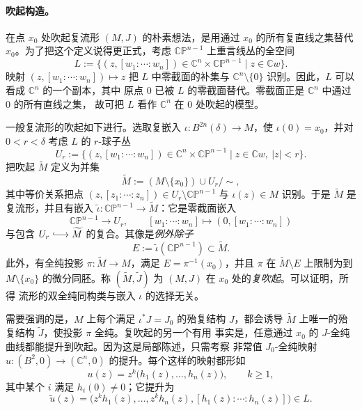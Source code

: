 \paragraph{吹起构造。}

在点 $x_0$ 处吹起复流形 $(M,J)$ 的朴素想法，是用通过 $x_0$ 的所有复直线之集替代
$x_0$。为了把这个定义说得更正式，考虑 $\mathbb{CP}^{n-1}$ 上重言线丛的全空间
\[
  L:=\bigl\{(z,[w_1:\cdots:w_n])\in\mathbb C^n\times\mathbb{CP}^{n-1}
  \mid z\in\mathbb Cw\bigr\}.
\]
映射 $(z,[w_1:\cdots:w_n])\mapsto z$ 把 $L$ 中零截面的补集与
$\mathbb C^n\setminus\{0\}$ 识别。因此，$L$ 可以看成 $\mathbb C^n$ 的一个副本，其中
原点 $0$ 已被 $L$ 的零截面替代。零截面正是 $\mathbb C^n$ 中通过 $0$ 的所有直线之集，
故可把 $L$ 看作 $\mathbb C^n$ 在 $0$ 处吹起的模型。

一般复流形的吹起如下进行。选取复嵌入
$\iota:B^{2n}(\delta)\to M$，使 $\iota(0)=x_0$，并对
$0<r<\delta$ 考虑 $L$ 的 $r$-球子丛
\[
  U_r:=\bigl\{(z,[w_1:\cdots:w_n])\in\mathbb C^n\times\mathbb{CP}^{n-1}
  \mid z\in\mathbb Cw,\ |z|<r\bigr\}.
\]
把吹起 $\widetilde M$ 定义为并集
\[
  \widetilde M:=(M\setminus\{x_0\})\cup U_r\big/\sim,
\]
其中等价关系把点
$(z,[z_1:\cdots:z_n])\in U_r\setminus\mathbb{CP}^{n-1}$ 与
$\iota(z)\in M$ 识别。于是 $\widetilde M$ 是复流形，并且有嵌入
$\widetilde\iota:\mathbb{CP}^{n-1}\to\widetilde M$：它是零截面嵌入
\[
  \mathbb{CP}^{n-1}\longrightarrow U_r,
  \qquad [w_1:\cdots:w_n]\longmapsto(0,[w_1:\cdots:w_n])
\]
与包含 $U_r\lhook\joinrel\longrightarrow\widetilde M$ 的复合。其像是\emph{例外除子}
\[
  E:=\widetilde\iota(\mathbb{CP}^{n-1})\subset\widetilde M.
\]
此外，有全纯投影 $\pi:\widetilde M\to M$，满足 $E=\pi^{-1}(x_0)$，并且 $\pi$ 在
$\widetilde M\setminus E$ 上限制为到 $M\setminus\{x_0\}$ 的微分同胚。称
$(\widetilde M,\widetilde J)$ 为 $(M,J)$ 在 $x_0$ 处的\emph{复吹起}。可以证明，所得
流形的双全纯同构类与嵌入 $\iota$ 的选择无关。

需要强调的是，$M$ 上每个满足 $\iota^*J=J_0$ 的殆复结构 $J$，都会诱导
$\widetilde M$ 上唯一的殆复结构 $\widetilde J$，使投影 $\pi$ 全纯。复吹起的另一个有用
事实是，任意通过 $x_0$ 的 $J$-全纯曲线都能提升到吹起。因为这是局部陈述，只需考察
非常值 $J_0$-全纯映射 $u:(B^2,0)\to(\mathbb C^n,0)$ 的提升。每个这样的映射都形如
\begin{equation}\label{eq:9-3-1}
  u(z)=z^k\bigl(h_1(z),\ldots,h_n(z)\bigr),
  \qquad k\ge1,
\end{equation}
其中某个 $i$ 满足 $h_i(0)\ne0$；它提升为
\[
  \widetilde u(z)=
  \bigl(z^kh_1(z),\ldots,z^kh_n(z),[h_1(z):\cdots:h_n(z)]\bigr)\in L.
\]

